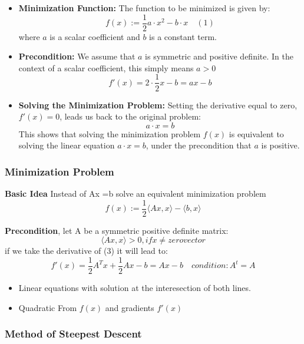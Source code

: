 \documentclass[unicode,11pt,a4paper,oneside,numbers=endperiod,openany]{scrartcl}
\begin{document}
\begin{itemize}
    \item \textbf{Minimization Function:} The function to be minimized is given by:
    \[
    f(x) := \frac{1}{2}a \cdot x^2 - b \cdot x \quad (1)
    \]
    where \( a \) is a scalar coefficient and \( b \) is a constant term.

    \item \textbf{Precondition:} We assume that \( a \) is symmetric and positive definite. In the context of a scalar coefficient, this simply means \( a > 0 \)
    \[
    f'(x) = 2 \cdot \frac{1}{2} x-b = ax-b
    \]

    \item \textbf{Solving the Minimization Problem:} Setting the derivative equal to zero, \( f'(x) = 0 \), leads us back to the original problem:
    \[
    a \cdot x = b
    \]
    This shows that solving the minimization problem \( f(x) \) is equivalent to solving the linear equation \( a \cdot x = b \), under the precondition that \( a \) is positive.
\end{itemize}

\subsubsection{Minimization Problem}
\begin{itemize}
 \item {\textbf{Basic Idea}\newline
 Instead of Ax =b solve an equivalent minimization problem \[f(x) := \frac{1}{2}\langle Ax,x \rangle -\langle b,x\rangle\]
 \item{\textbf{Precondition}, let A be a symmetric positive definite matrix: \newline
 \[
  \langle Ax,x\rangle >0, if x \neq zero vector
 \]
 if we take the derivative of (3) it will lead to: \[
                                                    f'(x) = \frac{1}{2}A^Tx+\frac{1}{2} Ax-b = Ax-b \quad condition: A^t=A\]
}
}
\end{itemize}

\begin{itemize}
 \item Linear equations with solution at the interesection of both lines.
 \item Quadratic From $f(x)$ and gradients $f'(x)$
\end{itemize}

\subsubsection{Method of Steepest Descent}
\end{document}

